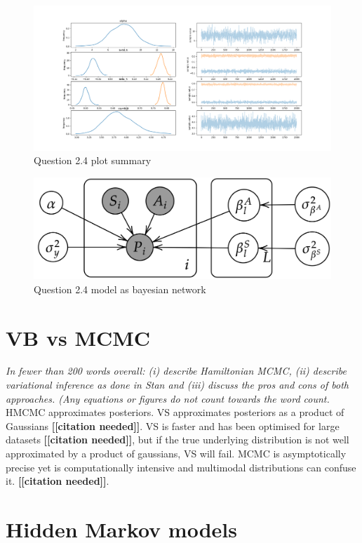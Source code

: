 \documentclass[11pt,a4paper,titlepage]{article}
\begin{document}
  \begin{figure}[htb]
    \centering
      \includegraphics[width=\textwidth]{../q24/q24_plot_summary.png}
      \caption{Question 2.4 plot summary}
    \label{fig:2.4}
  \end{figure}

  \begin{figure}[htb]
    \centering
      \includegraphics[width=\textwidth]{../q24/q24_bnet.png}
      \caption{Question 2.4 model as bayesian network}
    \label{fig:2.4_bnet}
  \end{figure}


\section{VB vs MCMC}

\textit{In fewer than 200 words overall: (i) describe Hamiltonian MCMC, (ii) describe variational inference as done in Stan and (iii) discuss the pros and cons of both approaches. (Any equations or figures do not count towards the word count.}
HMCMC approximates posteriors. VS approximates posteriors as a product of Gaussians \textbf{[[citation needed]]}.
VS is faster and has been optimised for large datasets \textbf{[[citation needed]]}, but if the true underlying distribution is not well approximated by a product of gaussians, VS will fail. MCMC is asymptotically precise yet is computationally intensive and multimodal distributions can confuse it. \textbf{[[citation needed]]}.


\section{Hidden Markov models}
\end{document}
